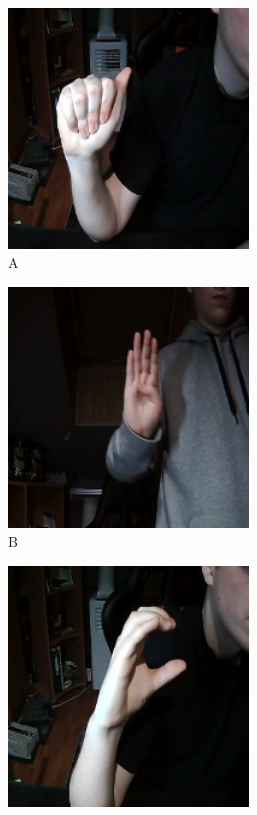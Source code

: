 \documentclass[a4paper,12pt,oneside]{book} %
\begin{document}
\begin{figure}[h]
	\centering
		\begin{subfigure}{0.4\textwidth}
			\centering
			\includegraphics[width=0.7\textwidth]{asl_a.png}
			\caption{A}
		\end{subfigure}
		\begin{subfigure}{0.4\textwidth}
			\centering
			\includegraphics[width=0.7\textwidth]{asl_b.png}
			\caption{B}
		\end{subfigure}
		\begin{subfigure}{0.4\textwidth}
			\centering
			\includegraphics[width=0.7\textwidth]{asl_c.png}

\end{subfigure}
\end{figure}
\end{document}
